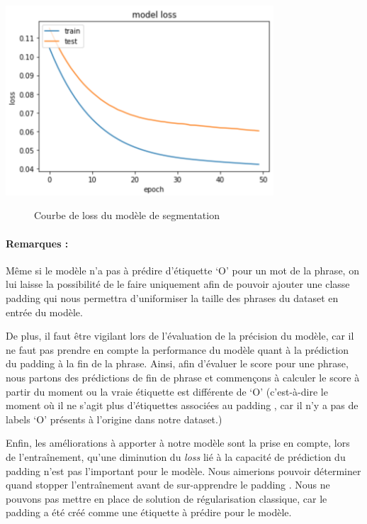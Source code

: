 \documentclass[a4paper, twoside, 11pt]{article}
\begin{document}
 \begin{center}
 \includegraphics[width=10cm,angle=0]{loss.png}
\begin{figure}[!h]
\caption{Courbe de loss du modèle de segmentation}
\end{figure}
 \end{center}

 \paragraph{Remarques :}
 Même si le modèle n’a pas à prédire d’étiquette ‘O’ pour un mot de la phrase, on lui laisse la possibilité de le faire uniquement afin de pouvoir ajouter une classe \og padding \fg{} qui nous permettra d’uniformiser la taille des phrases du dataset en entrée du modèle.

De plus, il faut être vigilant lors de l’évaluation de la précision du modèle, car il ne faut pas prendre en compte la performance du modèle quant à la prédiction du \og padding \fg{} à la fin de la phrase. Ainsi, afin d’évaluer le score pour une phrase, nous partons des prédictions de fin de phrase et commençons à calculer le score à partir du moment ou la vraie étiquette est différente de ‘O’ (c'est-à-dire le moment où il ne s’agit plus d'étiquettes associées au \og padding \fg{}, car il n’y a pas de labels ‘O’ présents à l’origine dans notre dataset.)

Enfin, les améliorations à apporter à notre modèle sont la prise en compte, lors de l’entraînement, qu’une diminution du \textit{loss} lié à la capacité de prédiction du \og padding \fg{} n’est pas l’important pour le modèle. Nous aimerions pouvoir déterminer quand stopper l’entraînement avant de sur-apprendre le \og padding \fg{}. Nous ne pouvons pas mettre en place de solution de régularisation classique, car le \og padding \fg{} a été créé comme une étiquette à prédire pour le modèle.
\end{document}
